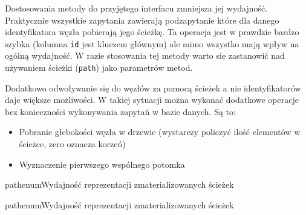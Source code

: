 











Dostosowania metody do przyjętego interfacu zmniejsza jej wydajność.
Praktycznie wszystkie zapytania zawierają podzapytanie które dla danego identyfikatora węzła  pobierają jego ścieżkę.
Ta operacja jest w prawdzie bardzo szybka (kolumna \texttt{id} jest kluczem głównym) ale mimo wszystko mają wpływ na ogólną wydajność.
W razie stosowania tej metody warto sie zastanowić nad używaniem ścieżki (\texttt{path}) jako parametrów metod. 

Dodatkowo odwoływanie się do węzłów za pomocą ścieżek a nie identyfikatorów daje większe możliwości.
W takiej sytuacji można wykonać dodatkowe operacje bez konieczności wykonywania zapytań w bazie danych.
Są to:
\begin{itemize}
    \item
        Pobranie głebokości węzła w drzewie (wystarczy policzyć ilość elementów w ścieżce, zero oznacza korzeń)
    \item
        Wyznaczenie pierwszego wspólnego potomka
\end{itemize}


\begin{qxtab}{pathenum}{Wydajność reprezentacji zmaterializowanych ścieżek}
\end{qxtab}

\begin{qxfig}{pathenum}{Wydajność reprezentacji zmaterializowanych ścieżek}
\end{qxfig}


